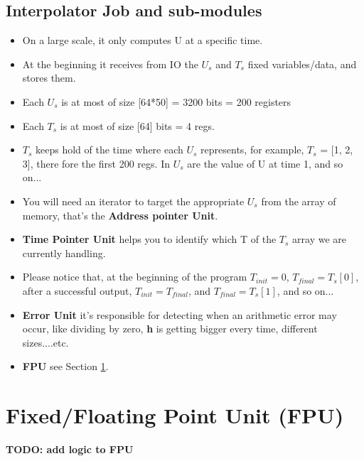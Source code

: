\documentclass[12pt]{report}
\begin{document}
\subsection{Interpolator Job and sub-modules}
\begin{itemize}
    \item On a large scale, it only computes U at a specific time.
    \item At the beginning it receives from IO the $U_s$ and $T_s$ fixed variables/data, and stores them.
    \item Each $U_s$ is at most of size [64*50] = 3200 bits = 200 registers
    \item Each $T_s$ is at most of size [64] bits = 4 regs.
    \item $T_s$ keeps hold of the time where each $U_s$ represents, for example, $T_s$ = [1, 2, 3], there fore the first 200 regs. In $U_s$ are the value of U at time 1, and so on... 
    \item You will need an iterator to target the appropriate $U_s$ from the array of memory, that's the \textbf{Address pointer Unit}.
    \item \textbf{Time Pointer Unit} helps you to identify which T of the $T_s$ array we are currently handling.
    \item Please notice that, at the beginning of the program $T_{init} = 0$, $T_{final} = T_s[0]$, after a successful output, $T_{init} = T_{final}$, and $T_{final} = T_s[1]$, and so on...
    \item \textbf{Error Unit} it's responsible for detecting when an arithmetic error may occur, like dividing by zero, \textbf{h} is getting bigger every time, different sizes....etc.
    \item \textbf{FPU} see Section \ref{sec:fpu}.
\end{itemize}

\section{Fixed/Floating Point Unit (FPU)}
\label{sec:fpu}

\textbf{TODO: add logic to FPU}
\end{document}
